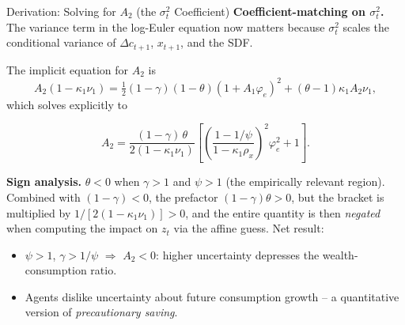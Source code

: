 \documentclass{beamer}
\begin{document}
\begin{frame}{Derivation: Solving for $A_2$ (the $\sigma_t^2$ Coefficient)}
    \textbf{Coefficient-matching on $\sigma_t^2$.} The variance term in the log-Euler equation now matters because $\sigma_t^2$ scales the conditional variance of $\Delta c_{t+1}$, $x_{t+1}$, and the SDF.

    The implicit equation for $A_2$ is
    \begin{equation*}
        A_2(1-\kappa_1\nu_1) = \tfrac{1}{2}(1-\gamma)(1-\theta)(1+A_1\varphi_e)^2 + (\theta-1)\kappa_1 A_2\nu_1,
    \end{equation*}
    which solves explicitly to
    \begin{tcolorbox}[colback=blue!5!white, colframe=blue!75!black, title=Closed Form for $A_2$]
    \begin{equation}
        A_2 = \frac{(1-\gamma)\,\theta}{2(1-\kappa_1\nu_1)}\left[\left(\frac{1-1/\psi}{1-\kappa_1\rho_x}\right)^{\!2}\!\varphi_e^2 + 1\right].
    \end{equation}
    \end{tcolorbox}
    \textbf{Sign analysis.} $\theta < 0$ when $\gamma > 1$ and $\psi > 1$ (the empirically relevant region). Combined with $(1-\gamma) < 0$, the prefactor $(1-\gamma)\theta > 0$, but the bracket is multiplied by $1/[2(1-\kappa_1\nu_1)] > 0$, and the entire quantity is then \emph{negated} when computing the impact on $z_t$ via the affine guess. Net result:
    \vspace{2pt}
    \begin{itemize}
        \item $\psi > 1$, $\gamma > 1/\psi$ $\Rightarrow$ \textbf{$A_2 < 0$}: higher uncertainty depresses the wealth-consumption ratio.
        \item Agents dislike uncertainty about future consumption growth -- a quantitative version of \emph{precautionary saving}.
    \end{itemize}
\end{frame}
\end{document}
